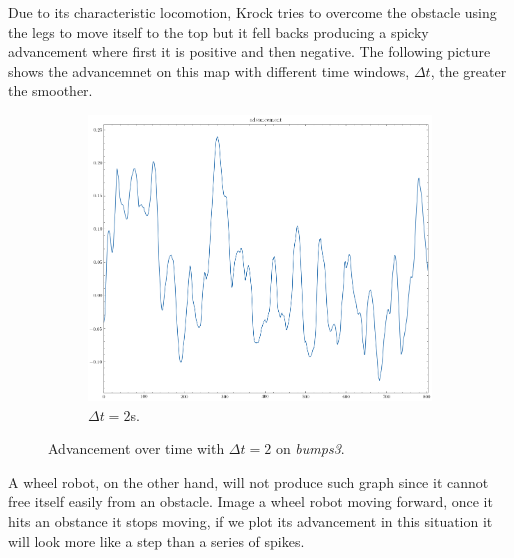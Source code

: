 \documentclass[../document.tex]{subfiles}
\begin{document}
Due to its characteristic locomotion, Krock tries to overcome the obstacle using the legs to move itself to the top but it fell backs producing a spicky advancement where first it is positive and then negative. The following picture shows the advancemnet on this map with different time windows, $\Delta t$, the greater the smoother.

\begin{figure}[htbp]
    \centering
    \begin{subfigure}[b]{0.45\textwidth}
        \includegraphics[width=\linewidth]{../img/3/find_tr/100-bumps3}
        \caption{$\Delta t = 2$s.}
    \end{subfigure}

\caption{Advancement over time with  $\Delta t = 2$ on \emph{bumps3}.}
\end{figure}
A wheel robot, on the other hand, will not produce such graph since it cannot free itself easily from an obstacle. Image a wheel robot moving forward, once it hits an obstance it stops moving, if we plot its advancement in this situation it will look more like a step than a series of spikes.
\end{document}
